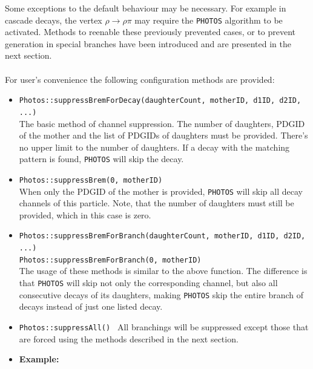 \documentclass[]{Photos_interface_design}
\begin{document}
Some exceptions to the default behaviour may be necessary. For example
in cascade decays, the vertex $\rho \to \rho \pi$ may require the
{\tt PHOTOS} algorithm to be activated.
Methods to reenable these previously prevented cases, or to prevent generation in special
branches have been introduced and are presented in the next section. \\ \\ 


For user's convenience the following configuration methods are provided:
\begin{itemize}
 \item {\tt Photos::suppressBremForDecay(daughterCount, motherID, d1ID, d2ID, ...)} \hfill \\
       The basic method of channel suppression. The number of daughters,
	   PDGID of the mother and the list of PDGIDs of daughters must be provided.
	   There's no upper limit to the number of daughters.
	   If a decay with the matching pattern is found, {\tt PHOTOS} will skip the decay.
 \item {\tt Photos::suppressBrem(0, motherID)} \hfill \\
       When only the PDGID of the mother is provided, {\tt PHOTOS} will skip all decay channels
	   of this particle. Note, that the number of daughters must still be provided,
	   which in this case is zero.
 \item {\tt Photos::suppressBremForBranch(daughterCount, motherID, d1ID, d2ID, ...)} \hfill \\
       {\tt Photos::suppressBremForBranch(0, motherID)} \hfill \\
       The usage of these methods is similar to the above function. The difference is
	   that {\tt PHOTOS} will skip not only the corresponding channel,
	   but also all consecutive decays of its daughters, making {\tt PHOTOS} skip the entire branch
	   of decays instead of just one listed decay.
 \item {\tt Photos::suppressAll() }
       All branchings will be suppressed except those that are forced using the methods
	   described in the next section.
 \item \textbf{Example:} \hfill \\

\end{itemize}
\end{document}
